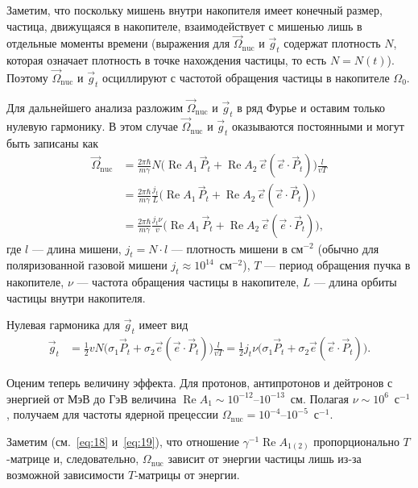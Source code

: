 \documentclass[11pt,a4paper]{article}
\DeclareMathOperator{\Reop}{Re}
\begin{document}
Заметим, что поскольку мишень внутри накопителя имеет конечный размер,
частица, движущаяся в накопителе, взаимодействует с мишенью лишь в отдельные
моменты времени (выражения для $\vec{\Omega}_{\mathrm{nuc}}$ и $\vec{g}_t$
содержат плотность $N$, которая означает плотность в точке нахождения
частицы, то есть $N=N(t)$). Поэтому $\vec{\Omega}_{\mathrm{nuc}}$ и
$\vec{g}_t$ осциллируют с частотой обращения частицы в накопителе
$\Omega_0$.

Для дальнейшего анализа разложим $\vec{\Omega}_{\mathrm{nuc}}$ и $\vec{g}_t$
в ряд Фурье и оставим только нулевую гармонику. В этом случае
$\vec{\Omega}_{\mathrm{nuc}}$ и $\vec{g}_t$ оказываются постоянными
и могут быть записаны как
\begin{equation}
\begin{aligned}
\vec{\Omega}_{\mathrm{nuc}}
&=\frac{2\pi\hbar}{m\gamma}N\bigl(
\Reop A_1\,\vec{P}_t+\Reop A_2\,\vec{e}(\vec{e}\cdot\vec{P}_t)
\bigr)\frac{l}{v T}
\\
&=\frac{2\pi\hbar}{m\gamma}\frac{j_t}{L}\bigl(
\Reop A_1\,\vec{P}_t+\Reop A_2\,\vec{e}(\vec{e}\cdot\vec{P}_t)
\bigr)
\\
&=\frac{2\pi\hbar}{m\gamma}\frac{j_t\nu}{v}\bigl(
\Reop A_1\,\vec{P}_t+\Reop A_2\,\vec{e}(\vec{e}\cdot\vec{P}_t)
\bigr),
\end{aligned}
\label{eq:105}
\end{equation}
где $l$ --- длина мишени, $j_t=N\cdot l$ --- плотность мишени в см$^{-2}$
(обычно для поляризованной газовой мишени $j_t\approx 10^{14}$~см$^{-2}$),
$T$ --- период обращения пучка в накопителе, $\nu$ --- частота обращения
частицы в накопителе, $L$ --- длина орбиты частицы внутри накопителя.

Нулевая гармоника для $\vec{g}_t$ имеет вид
\begin{equation}
\begin{aligned}
\vec{g}_t
&=\frac12 v N\bigl(\sigma_1\vec{P}_t+\sigma_2\vec{e}(\vec{e}\cdot\vec{P}_t)\bigr)
\frac{l}{v T}
=\frac12 j_t\nu\bigl(\sigma_1\vec{P}_t+\sigma_2\vec{e}(\vec{e}\cdot\vec{P}_t)\bigr).
\end{aligned}
\label{eq:106}
\end{equation}

Оценим теперь величину эффекта. Для протонов, антипротонов и дейтронов
с энергией от МэВ до ГэВ величина $\Reop A_1\sim 10^{-12}$--$10^{-13}$~см.
Полагая $\nu\sim 10^{6}$~с$^{-1}$, получаем для частоты ядерной прецессии
$\Omega_{\mathrm{nuc}}=10^{-4}$--$10^{-5}$~с$^{-1}$.

Заметим (см.~\eqref{eq:18} и~\eqref{eq:19}), что отношение
$\gamma^{-1}\Reop A_{1(2)}$ пропорционально $T$-матрице и, следовательно,
$\Omega_{\mathrm{nuc}}$ зависит от энергии частицы лишь из-за возможной
зависимости $T$-матрицы от энергии.
\end{document}
